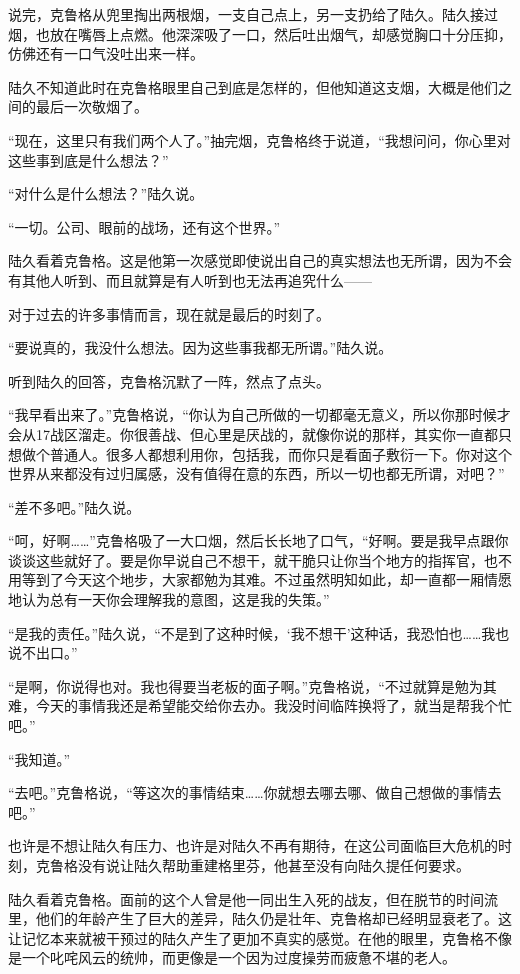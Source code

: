 说完，克鲁格从兜里掏出两根烟，一支自己点上，另一支扔给了陆久。陆久接过烟，也放在嘴唇上点燃。他深深吸了一口，然后吐出烟气，却感觉胸口十分压抑，仿佛还有一口气没吐出来一样。

陆久不知道此时在克鲁格眼里自己到底是怎样的，但他知道这支烟，大概是他们之间的最后一次敬烟了。

“现在，这里只有我们两个人了。”抽完烟，克鲁格终于说道，“我想问问，你心里对这些事到底是什么想法？”

“对什么是什么想法？”陆久说。

“一切。公司、眼前的战场，还有这个世界。”

陆久看着克鲁格。这是他第一次感觉即使说出自己的真实想法也无所谓，因为不会有其他人听到、而且就算是有人听到也无法再追究什么——

对于过去的许多事情而言，现在就是最后的时刻了。

“要说真的，我没什么想法。因为这些事我都无所谓。”陆久说。

听到陆久的回答，克鲁格沉默了一阵，然点了点头。

“我早看出来了。”克鲁格说，“你认为自己所做的一切都毫无意义，所以你那时候才会从17战区溜走。你很善战、但心里是厌战的，就像你说的那样，其实你一直都只想做个普通人。很多人都想利用你，包括我，而你只是看面子敷衍一下。你对这个世界从来都没有过归属感，没有值得在意的东西，所以一切也都无所谓，对吧？”

“差不多吧。”陆久说。

“呵，好啊……”克鲁格吸了一大口烟，然后长长地了口气，“好啊。要是我早点跟你谈谈这些就好了。要是你早说自己不想干，就干脆只让你当个地方的指挥官，也不用等到了今天这个地步，大家都勉为其难。不过虽然明知如此，却一直都一厢情愿地认为总有一天你会理解我的意图，这是我的失策。”

“是我的责任。”陆久说，“不是到了这种时候，‘我不想干’这种话，我恐怕也……我也说不出口。”

“是啊，你说得也对。我也得要当老板的面子啊。”克鲁格说，“不过就算是勉为其难，今天的事情我还是希望能交给你去办。我没时间临阵换将了，就当是帮我个忙吧。”

“我知道。”

“去吧。”克鲁格说，“等这次的事情结束……你就想去哪去哪、做自己想做的事情去吧。”

也许是不想让陆久有压力、也许是对陆久不再有期待，在这公司面临巨大危机的时刻，克鲁格没有说让陆久帮助重建格里芬，他甚至没有向陆久提任何要求。

陆久看着克鲁格。面前的这个人曾是他一同出生入死的战友，但在脱节的时间流里，他们的年龄产生了巨大的差异，陆久仍是壮年、克鲁格却已经明显衰老了。这让记忆本来就被干预过的陆久产生了更加不真实的感觉。在他的眼里，克鲁格不像是一个叱咤风云的统帅，而更像是一个因为过度操劳而疲惫不堪的老人。

